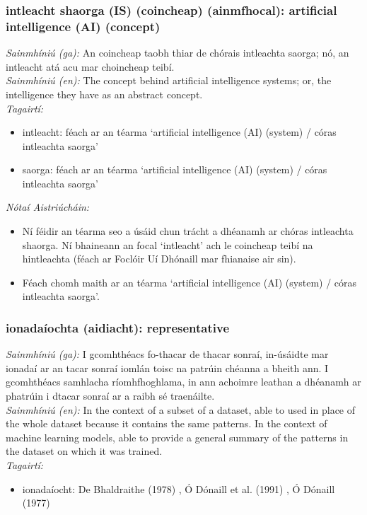 \subsubsection*{intleacht shaorga (IS) (coincheap) (ainmfhocal): artificial intelligence (AI) (concept)}
 \noindent \textit{Sainmhíniú (ga):} An coincheap taobh thiar de chórais intleachta saorga; nó, an intleacht atá acu mar choincheap teibí.
\\
 \noindent \textit{Sainmhíniú (en):} The concept behind artificial intelligence systems; or, the intelligence they have as an abstract concept.
\\
 \noindent \textit{Tagairtí:}
\begin{itemize}
	\item intleacht: féach ar an téarma `artificial intelligence (AI) (system) / córas intleachta saorga'
	\item saorga: féach ar an téarma `artificial intelligence (AI) (system) / córas intleachta saorga'
\end{itemize}

 \noindent \textit{Nótaí Aistriúcháin:}
\begin{itemize}
	\item Ní féidir an téarma seo a úsáid chun trácht a dhéanamh ar chóras intleachta shaorga. Ní bhaineann an focal `intleacht' ach le coincheap teibí na hintleachta (féach ar Foclóir Uí Dhónaill mar fhianaise air sin).
	\item Féach chomh maith ar an téarma `artificial intelligence (AI) (system) / córas intleachta saorga'.
\end{itemize}


\subsubsection*{ionadaíochta (aidiacht): representative}
 \noindent \textit{Sainmhíniú (ga):} I gcomhthéacs fo-thacar de thacar sonraí, in-úsáidte mar ionadaí ar an tacar sonraí iomlán toisc na patrúin chéanna a bheith ann. I gcomhthéacs samhlacha ríomhfhoghlama, in ann achoimre leathan a dhéanamh ar phatrúin i dtacar sonraí ar a raibh sé traenáilte.
\\
 \noindent \textit{Sainmhíniú (en):} In the context of a subset of a dataset, able to used in place of the whole dataset because it contains the same patterns. In the context of machine learning models, able to provide a general summary of the patterns in the dataset on which it was trained.
\\
 \noindent \textit{Tagairtí:}
\begin{itemize}
	\item ionadaíocht: De Bhaldraithe (1978) \cite{de-bhaldraithe}, Ó Dónaill et al. (1991) \cite{focloir-beag}, Ó Dónaill (1977) \cite{odonaill}
\end{itemize}

